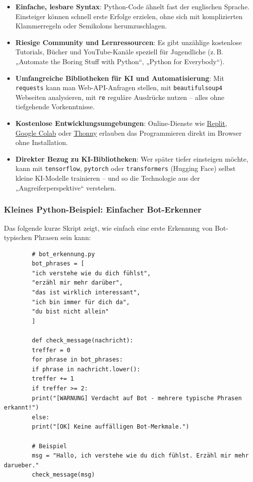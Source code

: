 \documentclass[12pt,a4paper,oneside]{scrartcl}
\begin{document}
	\begin{itemize}
		\item \textbf{Einfache, lesbare Syntax}: Python-Code ähnelt fast der englischen Sprache. Einsteiger können schnell erste Erfolge erzielen, ohne sich mit komplizierten Klammerregeln oder Semikolons herumzuschlagen.
		\item \textbf{Riesige Community und Lernressourcen}: Es gibt unzählige kostenlose Tutorials, Bücher und YouTube-Kanäle speziell für Jugendliche (z.\,B. „Automate the Boring Stuff with Python“, „Python for Everybody“).
		\item \textbf{Umfangreiche Bibliotheken für KI und Automatisierung}: Mit \texttt{requests} kann man Web-API-Anfragen stellen, mit \texttt{beautifulsoup4} Webseiten analysieren, mit \texttt{re} reguläre Ausdrücke nutzen – alles ohne tiefgehende Vorkenntnisse.
		\item \textbf{Kostenlose Entwicklungsumgebungen}: Online-Dienste wie \href{https://replit.com}{Replit}, \href{https://colab.research.google.com}{Google Colab} oder \href{https://thonny.org}{Thonny} erlauben das Programmieren direkt im Browser ohne Installation.
		\item \textbf{Direkter Bezug zu KI-Bibliotheken}: Wer später tiefer einsteigen möchte, kann mit \texttt{tensorflow}, \texttt{pytorch} oder \texttt{transformers} (Hugging Face) selbst kleine KI-Modelle trainieren – und so die Technologie aus der „Angreiferperspektive“ verstehen.
	\end{itemize}
	
	\subsubsection{Kleines Python-Beispiel: Einfacher Bot-Erkenner}
	
	Das folgende kurze Skript zeigt, wie einfach eine erste Erkennung von Bot-typischen Phrasen sein kann:
	
	\begin{verbatim}
		# bot_erkennung.py
		bot_phrases = [
		"ich verstehe wie du dich fühlst",
		"erzähl mir mehr darüber",
		"das ist wirklich interessant",
		"ich bin immer für dich da",
		"du bist nicht allein"
		]
		
		def check_message(nachricht):
		treffer = 0
		for phrase in bot_phrases:
		if phrase in nachricht.lower():
		treffer += 1
		if treffer >= 2:
		print("[WARNUNG] Verdacht auf Bot - mehrere typische Phrasen erkannt!")
		else:
		print("[OK] Keine auffälligen Bot-Merkmale.")
		
		# Beispiel
		msg = "Hallo, ich verstehe wie du dich fühlst. Erzähl mir mehr darueber."
		check_message(msg)
	\end{verbatim}
	
\end{document}
